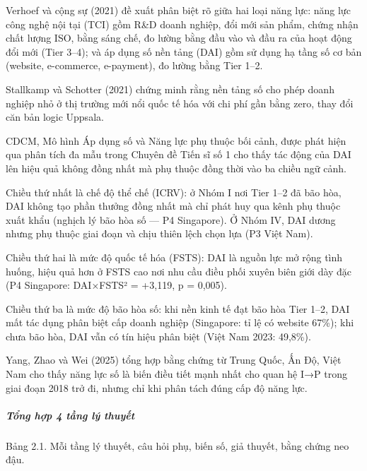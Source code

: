 \documentclass[12pt,a4paper]{article}
\begin{document}
Verhoef và cộng sự (2021) đề xuất phân biệt rõ giữa hai loại năng lực:
năng lực công nghệ nội tại (TCI) gồm R\&D doanh nghiệp, đổi mới sản
phẩm, chứng nhận chất lượng ISO, bằng sáng chế, đo lường bằng đầu vào và
đầu ra của hoạt động đổi mới (Tier 3--4); và áp dụng số nền tảng (DAI)
gồm sử dụng hạ tầng số cơ bản (website, e-commerce, e-payment), đo lường
bằng Tier 1--2.

Stallkamp và Schotter (2021) chứng minh rằng nền tảng số cho phép doanh
nghiệp nhỏ ở thị trường mới nổi quốc tế hóa với chi phí gần bằng zero,
thay đổi căn bản logic Uppsala.

CDCM, Mô hình Áp dụng số và Năng lực phụ thuộc bối cảnh, được phát hiện
qua phân tích đa mẫu trong Chuyên đề Tiến sĩ số 1 cho thấy tác động của
DAI lên hiệu quả không đồng nhất mà phụ thuộc đồng thời vào ba chiều ngữ
cảnh.

Chiều thứ nhất là chế độ thể chế (ICRV): ở Nhóm I nơi Tier 1--2 đã bão
hòa, DAI không tạo phần thưởng đồng nhất mà chỉ phát huy qua kênh phụ
thuộc xuất khẩu (nghịch lý bão hòa số --- P4 Singapore). Ở Nhóm IV, DAI
dương nhưng phụ thuộc giai đoạn và chịu thiên lệch chọn lựa (P3 Việt
Nam).

Chiều thứ hai là mức độ quốc tế hóa (FSTS): DAI là nguồn lực mở rộng
tình huống, hiệu quả hơn ở FSTS cao nơi nhu cầu điều phối xuyên biên
giới dày đặc (P4 Singapore: DAI×FSTS² = +3,119, p = 0,005).

Chiều thứ ba là mức độ bão hòa số: khi nền kinh tế đạt bão hòa Tier
1--2, DAI mất tác dụng phân biệt cấp doanh nghiệp (Singapore: tỉ lệ có
website 67\%); khi chưa bão hòa, DAI vẫn có tín hiệu phân biệt (Việt Nam
2023: 49,8\%).

Yang, Zhao và Wei (2025) tổng hợp bằng chứng từ Trung Quốc, Ấn Độ, Việt
Nam cho thấy năng lực số là biến điều tiết mạnh nhất cho quan hệ I→P
trong giai đoạn 2018 trở đi, nhưng chỉ khi phân tách đúng cấp độ năng
lực.

\hypertarget{tux1ed5ng-hux1ee3p-4-tux1ea7ng-luxfd-thuyux1ebft}{%
\subparagraph{Tổng hợp 4 tầng lý
thuyết}\label{tux1ed5ng-hux1ee3p-4-tux1ea7ng-luxfd-thuyux1ebft}}

Bảng 2.1. Mỗi tầng lý thuyết, câu hỏi phụ, biến số, giả thuyết, bằng
chứng neo đậu.
\end{document}
